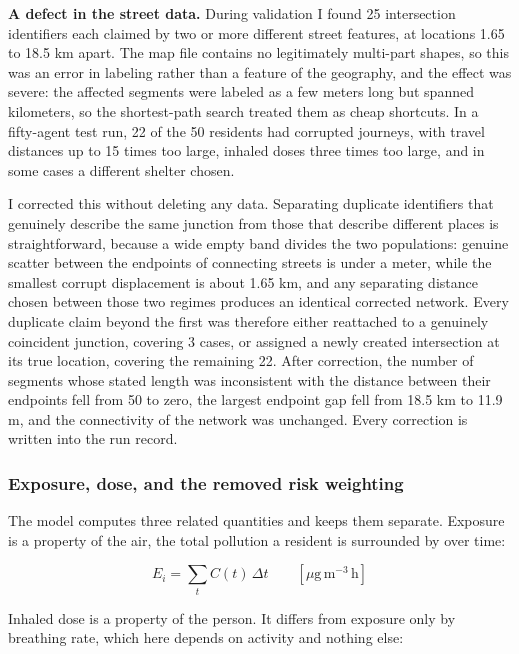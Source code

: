 \documentclass[graybox]{svmult}
\begin{document}
\textbf{A defect in the street data.} During validation I found 25 intersection
identifiers each claimed by two or more different street features, at locations
1.65 to 18.5 km apart. The map file contains no legitimately multi-part shapes, so
this was an error in labeling rather than a feature of the geography, and the
effect was severe: the affected segments were labeled as a few meters long but
spanned kilometers, so the shortest-path search treated them as cheap shortcuts.
In a fifty-agent test run, 22 of the 50 residents had corrupted journeys, with
travel distances up to 15 times too large, inhaled doses three times too large,
and in some cases a different shelter chosen.

I corrected this without deleting any data. Separating duplicate identifiers that
genuinely describe the same junction from those that describe different places is
straightforward, because a wide empty band divides the two populations: genuine
scatter between the endpoints of connecting streets is under a meter, while the
smallest corrupt displacement is about 1.65 km, and any separating distance
chosen between those two regimes produces an identical corrected network. Every
duplicate claim beyond the first was therefore either reattached to a genuinely
coincident junction, covering 3 cases, or assigned a newly created intersection
at its true location, covering the remaining 22. After correction, the number of
segments whose stated length was inconsistent with the distance between their
endpoints fell from 50 to zero, the largest endpoint gap fell from 18.5 km to
11.9 m, and the connectivity of the network was unchanged. Every correction is
written into the run record.

\subsubsection{Exposure, dose, and the removed risk weighting}
\label{sec:exposure}

The model computes three related quantities and keeps them separate. Exposure is
a property of the air, the total pollution a resident is surrounded by over time:

\begin{equation}
\label{eq:exposure}
E_i = \sum_t C(t)\, \Delta t
\qquad [\mu\mathrm{g}\,\mathrm{m}^{-3}\,\mathrm{h}]
\end{equation}

Inhaled dose is a property of the person. It differs from exposure only by
breathing rate, which here depends on activity and nothing else:
\end{document}
